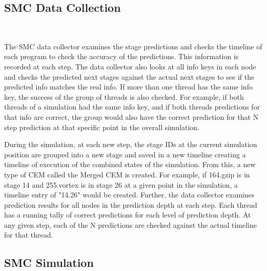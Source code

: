 
\subsection{SMC Data Collection}~\label{sec:simmc_data_collect}

The SMC data collector examines the stage predictions and checks the timeline
of each program to check the accuracy of the predictions.
This information is recorded at each step. The data
collector also looks at all info keys in each node and checks the predicted
next stages against the actual next stages to see if the predicted
info matches the real info. If more than one thread has the same info
key, the success of the group of threads is also checked. For example,
if both threads of a simulation had the same info key, and if both
threads predictions for that info are correct, the group would also
have the correct prediction for that N step prediction at that
specific point in the overall simulation.

During the simulation, at each new step, the stage IDs at the current
simulation position are grouped into a new stage and saved in a new
timeline creating a timeline of execution of the combined
states of the simulation. From this, a new type of CEM called the Merged CEM is
created. For example, if 164.gzip is in stage 14 and
255.vortex is in stage 26 at a given point in the simulation, a
timeline entry of "14.26" would be created.  Further, the data
collector examines prediction results for all nodes in the prediction
depth at each step. Each thread has a running tally of correct
predictions for each level of prediction depth. At any given step,
each of the N predictions are checked against the actual timeline for
that thread.

\subsection{SMC Simulation}~\label{sec:simmc_simulation}

